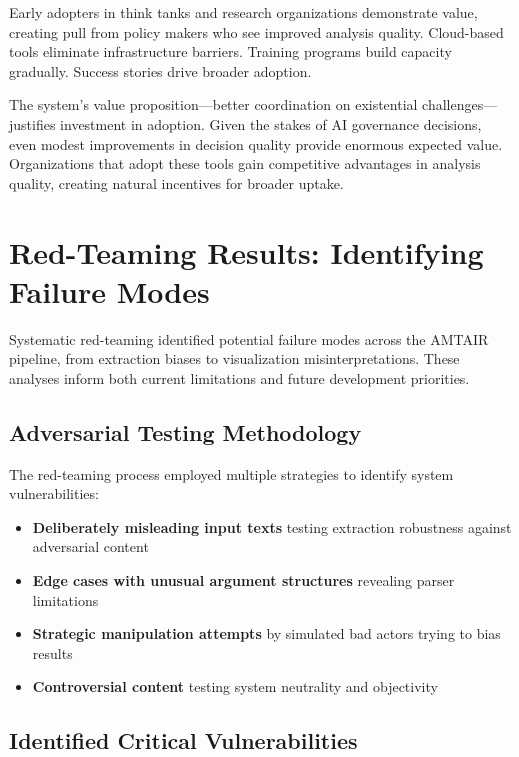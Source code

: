 \documentclass[
  11pt,
  letterpaper,
]{book}
\providecommand{\tightlist}{%
  \setlength{\itemsep}{0pt}\setlength{\parskip}{0pt}}
\begin{document}
Early adopters in think tanks and research organizations demonstrate
value, creating pull from policy makers who see improved analysis
quality. Cloud-based tools eliminate infrastructure barriers. Training
programs build capacity gradually. Success stories drive broader
adoption.

The system's value proposition---better coordination on existential
challenges---justifies investment in adoption. Given the stakes of AI
governance decisions, even modest improvements in decision quality
provide enormous expected value. Organizations that adopt these tools
gain competitive advantages in analysis quality, creating natural
incentives for broader uptake.

\section{Red-Teaming Results: Identifying Failure
Modes}\label{sec-red-teaming}

Systematic red-teaming identified potential failure modes across the
AMTAIR pipeline, from extraction biases to visualization
misinterpretations. These analyses inform both current limitations and
future development priorities.

\subsection{Adversarial Testing
Methodology}\label{sec-adversarial-testing}

The red-teaming process employed multiple strategies to identify system
vulnerabilities:

\begin{itemize}
\tightlist
\item
  \textbf{Deliberately misleading input texts} testing extraction
  robustness against adversarial content
\item
  \textbf{Edge cases with unusual argument structures} revealing parser
  limitations
\item
  \textbf{Strategic manipulation attempts} by simulated bad actors
  trying to bias results
\item
  \textbf{Controversial content} testing system neutrality and
  objectivity
\end{itemize}

\subsection{Identified Critical
Vulnerabilities}\label{sec-vulnerabilities}
\end{document}
